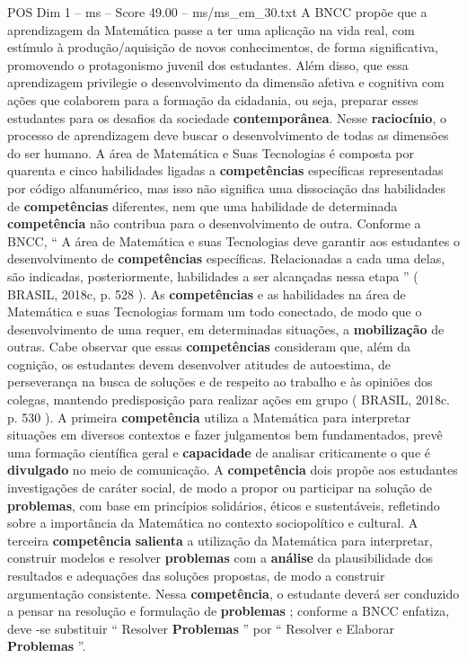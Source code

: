 \begin{textsample}{POS Dim 1 – ms – Score 49.00 – ms/ms\_em\_30.txt}
A BNCC propõe que a aprendizagem da Matemática passe a ter uma aplicação na vida real, com estímulo à produção/aquisição de novos conhecimentos, de forma significativa, promovendo o protagonismo juvenil dos estudantes.
Além disso, que essa aprendizagem privilegie o desenvolvimento da dimensão afetiva e cognitiva com ações que colaborem para a formação da cidadania, ou seja, preparar esses estudantes para os desafios da sociedade \textbf{contemporânea}.
Nesse \textbf{raciocínio}, o processo de aprendizagem deve buscar o desenvolvimento de todas as dimensões do ser humano.
A área de Matemática e Suas Tecnologias é composta por quarenta e cinco habilidades ligadas a \textbf{competências} específicas representadas por código alfanumérico, mas isso não significa uma dissociação das habilidades de \textbf{competências} diferentes, nem que uma habilidade de determinada \textbf{competência} não contribua para o desenvolvimento de outra.
Conforme a BNCC, “ A área de Matemática e suas Tecnologias deve garantir aos estudantes o desenvolvimento de \textbf{competências} específicas.
Relacionadas a cada uma delas, são indicadas, posteriormente, habilidades a ser alcançadas nessa etapa ” ( BRASIL, 2018c, p. 528 ).
As \textbf{competências} e as habilidades na área de Matemática e suas Tecnologias formam um todo conectado, de modo que o desenvolvimento de uma requer, em determinadas situações, a \textbf{mobilização} de outras.
Cabe observar que essas \textbf{competências} consideram que, além da cognição, os estudantes devem desenvolver atitudes de autoestima, de perseverança na busca de soluções e de respeito ao trabalho e às opiniões dos colegas, mantendo predisposição para realizar ações em grupo ( BRASIL, 2018c. p. 530 ).
A primeira \textbf{competência} utiliza a Matemática para interpretar situações em diversos contextos e fazer julgamentos bem fundamentados, prevê uma formação científica geral e \textbf{capacidade} de analisar criticamente o que é \textbf{divulgado} no meio de comunicação.
A \textbf{competência} dois propõe aos estudantes investigações de caráter social, de modo a propor ou participar na solução de \textbf{problemas}, com base em princípios solidários, éticos e sustentáveis, refletindo sobre a importância da Matemática no contexto sociopolítico e cultural.
A terceira \textbf{competência} \textbf{salienta} a utilização da Matemática para interpretar, construir modelos e resolver \textbf{problemas} com a \textbf{análise} da plausibilidade dos resultados e adequações das soluções propostas, de modo a construir argumentação consistente.
Nessa \textbf{competência}, o estudante deverá ser conduzido a pensar na resolução e formulação de \textbf{problemas} ; conforme a BNCC enfatiza, deve -se substituir “ Resolver \textbf{Problemas} ” por “ Resolver e Elaborar \textbf{Problemas} ”.

\end{textsample}
